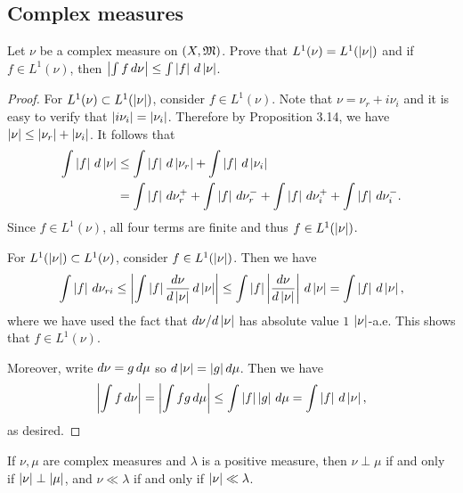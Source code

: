 \documentclass[a4paper]{article}
\begin{document}
\subsection{Complex measures}

\begin{ex}[Folland 3.18]
Let $\nu$ be a complex measure on $(X, \mf)$. Prove that 
$L^1 (\nu) = L^1 (\abs{\nu})$ and if $f \in L^1 (\nu)$, then 
$\abs{\int f \d \nu} \leq \int \abs{f} \d \abs{\nu}$.
\end{ex}

\begin{proof}
For $L^1 (\nu) \subset L^1 (\abs{\nu})$, consider $f \in L^1 (\nu)$.
Note that $\nu = \nu_r + i \nu_i$ and it is easy to 
verify that $\abs{i \nu_i} = \abs{\nu_i}$.
Therefore by Proposition 3.14, we have $\abs{\nu} \leq 
\abs{\nu_r} + \abs{\nu_i}$. It follows that 
\[
\begin{aligned}
\int \abs{f} \d \abs{\nu} 
&\leq \int \abs{f} \d \abs{\nu_r} + \int \abs{f} \d
\abs{\nu_i} \\
&= \int \abs{f} \d \nu_r^+ + \int \abs{f} \d \nu_r^- 
+ \int \abs{f} \d \nu_i^+ + \int \abs{f} \d \nu_i^-.
\end{aligned}
\]
Since $f \in L^1 (\nu)$, all four terms are finite and thus 
$f \in L^1 (\abs{\nu})$. 

For $L^1 (\abs{\nu}) \subset L^1 (\nu)$, consider $f \in L^1 
(\abs{\nu})$. Then we have 
\[
\int \abs{f} \d \nu_{ri}
\leq \abs{\int \abs{f} \frac{d \nu}{d \abs{\nu}} \d \abs{\nu}}
\leq \int \abs{f} \abs{\frac{d \nu}{d \abs{\nu}}} \d \abs{\nu} 
= \int \abs{f} \d \abs{\nu},
\]
where we have used the fact that $d \nu / d \abs{\nu}$ has 
absolute value $1$ $\abs{\nu}$-a.e. This shows that 
$f \in L^1 (\nu)$. 

Moreover, write $d \nu = g \d \mu$ so $d \abs{\nu} = \abs{g} d \mu$. Then
we have 
\[
\abs{\int f \d \nu} 
= \abs{\int f g \d \mu}
\leq \int \abs{f} \abs{g} \d \mu 
= \int \abs{f} \d \abs{\nu},
\]
as desired.
\end{proof}

\begin{ex}[Folland 3.19]
If $\nu, \mu$ are complex measures and $\lambda$ 
is a positive measure, then $\nu \perp \mu$ if and only 
if $\abs{\nu} \perp \abs{\mu}$, and $\nu \ll \lambda$ 
if and only if $\abs{\nu} \ll \lambda$.
\end{ex}
\end{document}
